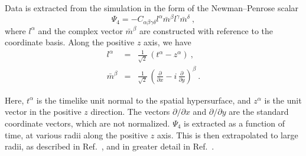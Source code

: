 Data is extracted from the simulation in the form of the
Newman--Penrose scalar
\begin{equation}
  \Psi_{4} = -C_{\alpha \beta \gamma \delta} l^{\alpha}
  \bar{m}^{\beta} l^{\gamma} \bar{m}^{\delta}\ ,
\end{equation}
where $l^{\alpha}$ and the complex vector $\bar{m}^{\beta}$ are
constructed with reference to the coordinate basis.  Along the
positive $z$ axis, we have
\begin{eqnarray}
  l^{\alpha} &= & \frac{1}{\sqrt{2}}\, \left( t^{\alpha} - z^{\alpha}
  \right)\ , \\
  \bar{m}^{\beta} &= & \frac{1}{\sqrt{2}}\, \left(
    \frac{\partial}{\partial x} - i\, \frac{\partial}{\partial y}
  \right)^{\beta}\ .
\end{eqnarray}

Here, $t^{\alpha}$ is the timelike unit normal to the spatial
hypersurface, and $z^{\alpha}$ is the unit vector in the positive $z$
direction.  The vectors $\partial/\partial x$ and $\partial/\partial
y$ are the standard coordinate vectors, which are not normalized.
$\Psi_{4}$ is extracted as a function of time, at various radii along
the positive $z$ axis.  This is then extrapolated to large radii, as
described in Ref.~\cite{Boyle2007}, and in greater detail in
Ref.~\cite{Boyle2008}.


